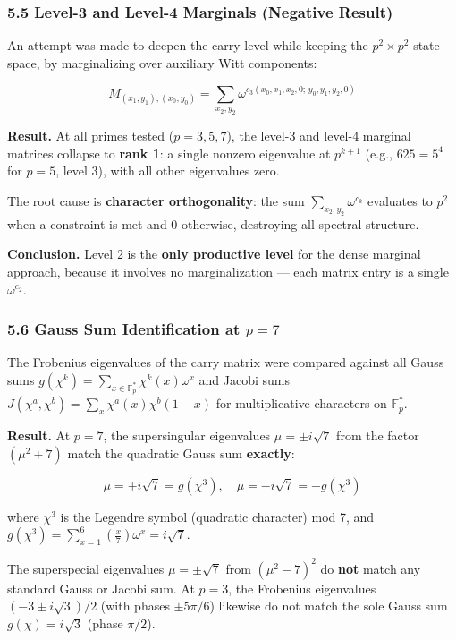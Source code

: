 \documentclass[
  11pt,
]{article}
\begin{document}
\subsubsection{5.5 Level-3 and Level-4 Marginals (Negative
Result)}\label{level-3-and-level-4-marginals-negative-result}

An attempt was made to deepen the carry level while keeping the
\(p^2 \times p^2\) state space, by marginalizing over auxiliary Witt components:

\[M_{(x_1,y_1),(x_0,y_0)} = \sum_{x_2, y_2} \omega^{c_3(x_0,x_1,x_2,0;\, y_0,y_1,y_2,0)}\]

\textbf{Result.} At all primes tested (\(p = 3, 5, 7\)), the level-3 and level-4
marginal matrices collapse to \textbf{rank 1}: a single nonzero eigenvalue at
\(p^{k+1}\) (e.g., \(625 = 5^4\) for \(p = 5\), level 3), with all other
eigenvalues zero.

The root cause is \textbf{character orthogonality}: the sum
\(\sum_{x_2,y_2} \omega^{c_k}\) evaluates to \(p^2\) when a constraint is met
and \(0\) otherwise, destroying all spectral structure.

\textbf{Conclusion.} Level 2 is the \textbf{only productive level} for the dense
marginal approach, because it involves no marginalization --- each matrix entry
is a single \(\omega^{c_2}\).

\subsubsection{\texorpdfstring{5.6 Gauss Sum Identification at
\(p = 7\)}{5.6 Gauss Sum Identification at p = 7}}\label{gauss-sum-identification-at-p-7}

The Frobenius eigenvalues of the carry matrix were compared against all Gauss
sums \(g(\chi^k) = \sum_{x \in \mathbb{F}_p^{\ast}} \chi^k(x) \omega^x\) and
Jacobi sums \(J(\chi^a, \chi^b) = \sum_x \chi^a(x) \chi^b(1-x)\) for
multiplicative characters on \(\mathbb{F}_p^{\ast}\).

\textbf{Result.} At \(p = 7\), the supersingular eigenvalues
\(\mu = \pm i\sqrt{7}\) from the factor \((\mu^2 + 7)\) match the quadratic
Gauss sum \textbf{exactly}:

\[\mu = +i\sqrt{7} = g(\chi^3), \quad \mu = -i\sqrt{7} = -g(\chi^3)\]

where \(\chi^3\) is the Legendre symbol (quadratic character) mod 7, and
\(g(\chi^3) = \sum_{x=1}^{6} \left(\frac{x}{7}\right) \omega^x = i\sqrt{7}\).

The superspecial eigenvalues \(\mu = \pm\sqrt{7}\) from \((\mu^2 - 7)^2\) do
\textbf{not} match any standard Gauss or Jacobi sum. At \(p = 3\), the Frobenius
eigenvalues \((-3 \pm i\sqrt{3})/2\) (with phases \(\pm 5\pi/6\)) likewise do
not match the sole Gauss sum \(g(\chi) = i\sqrt{3}\) (phase \(\pi/2\)).
\end{document}
